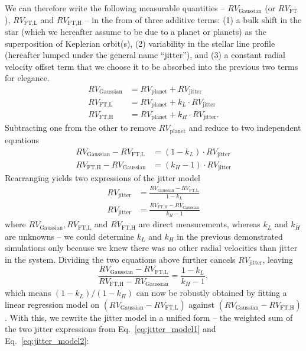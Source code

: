 We can therefore write the following measurable quantities -- $RV_\text{Gaussian}$ (or $RV_\text{FT}$), $RV_\text{FT,L}$ and $RV_\text{FT,H}$ -- in the from of three additive terms: (1) a bulk shift in the star (which we hereafter assume to be due to a planet or planets) as the superposition of Keplerian orbit(s), (2) variability in the stellar line profile (hereafter lumped under the general name ``jitter''), and (3) a constant radial velocity offset term that we choose it to be absorbed into the previous two terms for elegance.
\begin{align}
	RV_\text{Gaussian} 	&= RV_\text{planet} + RV_\text{jitter}				 \label{eq:RV_Gau} \\
	RV_\text{FT,L} 		&= RV_\text{planet} + k_L \cdot RV_\text{jitter} 		 \label{eq:RV_FTL} \\
	RV_\text{FT,H} 		&= RV_\text{planet} + k_H \cdot RV_\text{jitter}.		 \label{eq:RV_FTH}
\end{align}
Subtracting one from the other to remove $RV_\text{planet}$ and reduce to two independent equations
\begin{align}
	RV_\text{Gaussian} - RV_\text{FT,L} 	&= (1-k_L) \cdot RV_\text{jitter}\\
	RV_\text{FT,H} - RV_\text{Gaussian}	&= (k_H-1) \cdot RV_\text{jitter}
\end{align}
Rearranging yields two expressions of the jitter model
\begin{align}
	RV_\text{jitter} &= \frac{RV_\text{Gaussian} - RV_\text{FT,L}}{1-k_L} 	\label{eq:jitter_model1} \\
	RV_\text{jitter} &= \frac{RV_\text{FT,H} - RV_\text{Gaussian}}{k_H-1}		\label{eq:jitter_model2} 
\end{align}
where $RV_\text{Gaussian}, RV_\text{FT,L}$ and $RV_\text{FT,H}$ are direct measurements, whereas $k_L$ and $k_H$ are unknowns -- we could determine $k_L$ and $k_H$ in the previous demonstrated simulations only because we knew there was no other radial velocities than jitter in the system. Dividing the two equations above further cancels $RV_\text{jitter}$, leaving 
\begin{equation}
	\frac{RV_\text{Gaussian}-RV_\text{FT,L}}{RV_\text{FT,H} - RV_\text{Gaussian}} = \frac{1-k_L}{k_H-1},
\label{eq:GHL} 
\end{equation}
which means $(1-k_L)/(1-k_H)$ can now be robustly obtained by fitting a linear regression model on $(RV_\text{Gaussian}-RV_\text{FT,L})$ against $(RV_\text{Gaussian} - RV_\text{FT,H})$. With this, we rewrite the jitter model in a unified form -- the weighted sum of the two jitter expressions from Eq.~\ref{eq:jitter_model1} and Eq.~\ref{eq:jitter_model2}: 
